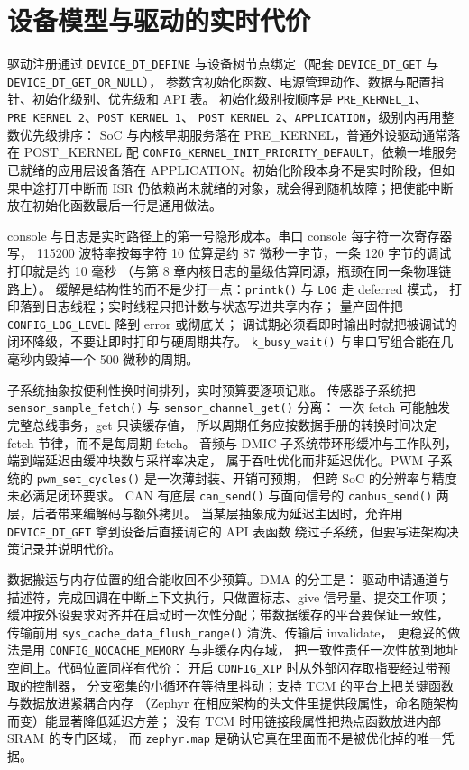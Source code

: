 \documentclass[12pt,a4paper,fontset=fandol]{ctexbook}
\newcommand{\Fn}[1]{\texttt{#1()}}
\newcommand{\Tp}[1]{\texttt{#1}}
\newcommand{\Bk}{\discretionary{}{}{}}
\begin{document}
\section{设备模型与驱动的实时代价}
\label{sec:ch07-devices}

驱动注册通过 \Tp{DEVICE\_{\Bk}DT\_{\Bk}DEFINE} 与设备树节点绑定（配套
\Tp{DEVICE\_{\Bk}DT\_{\Bk}GET} 与 \Tp{DEVICE\_{\Bk}DT\_{\Bk}GET\_{\Bk}OR\_{\Bk}NULL}），
参数含初始化函数、电源管理动作、数据与配置指针、初始化级别、优先级和 API 表。
初始化级别按顺序是 \Tp{PRE\_{\Bk}KERNEL\_{\Bk}1}、\Tp{PRE\_{\Bk}KERNEL\_{\Bk}2}、\Tp{POST\_{\Bk}KERNEL\_{\Bk}1}、
\Tp{POST\_{\Bk}KERNEL\_{\Bk}2}、\Tp{APPLICATION}，级别内再用整数优先级排序：
SoC 与内核早期服务落在 PRE\_KERNEL，普通外设驱动通常落在 POST\_KERNEL
配 \Tp{CONFIG\_{\Bk}KERNEL\_{\Bk}INIT\_{\Bk}PRIORITY\_{\Bk}DEFAULT}，依赖一堆服务已就绪的应用层设备落在
APPLICATION。初始化阶段本身不是实时阶段，但如果中途打开中断而 ISR
仍依赖尚未就绪的对象，就会得到随机故障；把使能中断放在初始化函数最后一行是通用做法。

console 与日志是实时路径上的第一号隐形成本。串口 console 每字符一次寄存器写，
115200 波特率按每字符 10 位算是约 87 微秒一字节，一条 120 字节的调试打印就是约 10 毫秒
（与第 8 章内核日志的量级估算同源，瓶颈在同一条物理链路上）。
缓解是结构性的而不是少打一点：\Fn{printk} 与 \Tp{LOG} 走 deferred 模式，
打印落到日志线程；实时线程只把计数与状态写进共享内存；
量产固件把 \Tp{CONFIG\_LOG\_LEVEL} 降到 error 或彻底关；
调试期必须看即时输出时就把被调试的闭环降级，不要让即时打印与硬周期共存。
\Fn{k\_busy\_wait} 与串口写组合能在几毫秒内毁掉一个 500 微秒的周期。

子系统抽象按便利性换时间排列，实时预算要逐项记账。
传感器子系统把 \Fn{sensor\_{\Bk}sample\_{\Bk}fetch} 与 \Fn{sensor\_{\Bk}channel\_{\Bk}get} 分离：
一次 fetch 可能触发完整总线事务，get 只读缓存值，
所以周期任务应按数据手册的转换时间决定 fetch 节律，而不是每周期 fetch。
音频与 DMIC 子系统带环形缓冲与工作队列，端到端延迟由缓冲块数与采样率决定，
属于吞吐优化而非延迟优化。PWM 子系统的 \Fn{pwm\_{\Bk}set\_{\Bk}cycles} 是一次薄封装、开销可预期，
但跨 SoC 的分辨率与精度未必满足闭环要求。
CAN 有底层 \Fn{can\_send} 与面向信号的 \Fn{canbus\_{\Bk}send} 两层，后者带来编解码与额外拷贝。
当某层抽象成为延迟主因时，允许用 \Tp{DEVICE\_{\Bk}DT\_{\Bk}GET} 拿到设备后直接调它的 API 表函数
绕过子系统，但要写进架构决策记录并说明代价。

数据搬运与内存位置的组合能收回不少预算。DMA 的分工是：
驱动申请通道与描述符，完成回调在中断上下文执行，只做置标志、give 信号量、提交工作项；
缓冲按外设要求对齐并在启动时一次性分配；带数据缓存的平台要保证一致性，
传输前用 \Fn{sys\_cache\_data\_flush\_range} 清洗、传输后 invalidate，
更稳妥的做法是用 \Tp{CONFIG\_NOCACHE\_MEMORY} 与非缓存内存域，
把一致性责任一次性放到地址空间上。代码位置同样有代价：
开启 \Tp{CONFIG\_XIP} 时从外部闪存取指要经过带预取的控制器，
分支密集的小循环在等待里抖动；支持 TCM 的平台上把关键函数与数据放进紧耦合内存
（Zephyr 在相应架构的头文件里提供段属性，命名随架构而变）能显著降低延迟方差；
没有 TCM 时用链接段属性把热点函数放进内部 SRAM 的专门区域，
而 \Tp{zephyr.map} 是确认它真在里面而不是被优化掉的唯一凭据。
\end{document}
